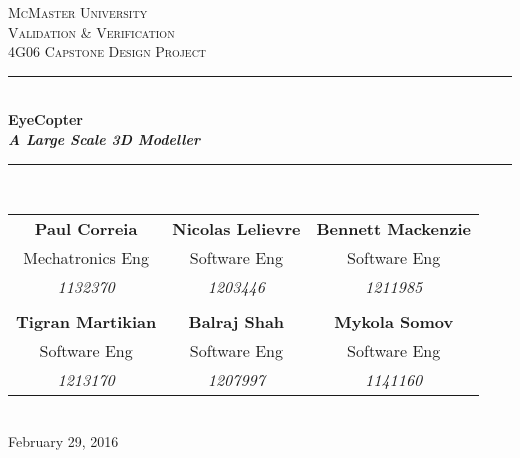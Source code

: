 \documentclass[10pt,letterpaper]{article}
\begin{document}
	
	
	\begin{titlepage}
		\newcommand{\HRule}{\rule{\linewidth}{0.5mm}}
		\center
		
		\textsc{\LARGE McMaster University}\\[1.5cm] %
		\textsc{\Large Validation \& Verification}\\[0.5cm] %
		\textsc{\large 4G06 Capstone Design Project}\\[0.5cm] %
		
		\HRule \\[0.4cm] 
		{ \huge \bfseries EyeCopter \\[2mm] \textit{A Large Scale 3D Modeller}}\\[0.4cm] %
		\HRule \\[1.5cm]
		
		\begin{tabular}{ccc}
			\bf{Paul Correia}		& \bf{Nicolas Lelievre} 	& \bf{Bennett Mackenzie}		\\
			Mechatronics Eng 		& Software Eng 				& Software Eng 					\\
			\textit{1132370} 		& \textit{1203446}			& \textit{1211985} 				\\ \\
			\bf{Tigran Martikian} 	& \bf{Balraj Shah} 			& \bf{Mykola Somov} 			\\
			Software Eng			& Software Eng				& Software Eng 					\\
			\textit{1213170} 		& \textit{1207997}			& \textit{1141160}
		\end{tabular}\\[4cm]
		
		{\large February 29, 2016}\\[3cm] 
		
		
		\vfill %
		
	\end{titlepage}
	
    
\thispagestyle{empty}

\tableofcontents


\newpage


\thispagestyle{empty}
\end{document}
